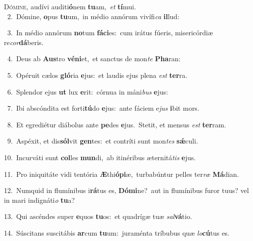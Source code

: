 \lettrine{\initial\textcolor{\initialcolor}{D}}{ómine,} audívi auditi\-\textbf{ó}\-nem \textbf{tu}\-am,~\star \textit{et} \textbf{tí}\-mui.\\
{\numbfont\textcolor{\numbcolor}{~2.}}~Dómine, \textbf{o}\-pus \textbf{tu}\-um,~\star in médio annórum vivífi\textit{ca} \textbf{il}\-lud:\par
{\numbfont\textcolor{\numbcolor}{~3.}}~In médio annórum \textbf{no}\-tum \textbf{fá}\-\textbf{ci}es:~\star cum irátus fúeris, misericórdiæ re\-\textit{cor}\-\textbf{dá}beris.\par
{\numbfont\textcolor{\numbcolor}{~4.}}~Deus ab \textbf{Aus}\-tro \textbf{vé}\-\textbf{ni}et,~\star et sanctus de mon\textit{te} \textbf{Pha}\-ran:\par
{\numbfont\textcolor{\numbcolor}{~5.}}~Opéruit cælos \textbf{gló}\-ria \textbf{e}\-jus:~\star et laudis ejus plena \textit{est} \textbf{ter}\-ra.\par
{\numbfont\textcolor{\numbcolor}{~6.}}~Splendor ejus \textbf{ut} lux \textbf{e}\-rit:~\star córnua in máni\textit{bus} \textbf{e}\-jus:\par
{\numbfont\textcolor{\numbcolor}{~7.}}~Ibi abscóndita est forti\-\textbf{tú}\-do \textbf{e}\-jus:~\star ante fáciem e\textit{jus} \textbf{i}\-bit mors.\par
{\numbfont\textcolor{\numbcolor}{~8.}}~Et egrediétur diábolus ante \textbf{pe}\-des \textbf{e}\-jus.~\star Stetit, et mensus \textit{est} \textbf{ter}\-ram.\par
{\numbfont\textcolor{\numbcolor}{~9.}}~Aspéxit, et dis\-\textbf{sól}\-vit \textbf{gen}\-tes:~\star et contríti sunt mon\textit{tes} \textbf{sǽ}\-culi.\par
{\numbfont\textcolor{\numbcolor}{10.}}~Incurváti sunt \textbf{col}\-les \textbf{mun}\-di,~\star ab itinéribus æternitá\textit{tis} \textbf{e}\-jus.\par
{\numbfont\textcolor{\numbcolor}{11.}}~Pro iniquitáte vidi tentória \textbf{Æ}\-thi\-\textbf{ó}\-\textbf{pi}æ,~\star turbabúntur pelles ter\textit{ræ} \textbf{Má}\-dian.\par
{\numbfont\textcolor{\numbcolor}{12.}}~Numquid in flumínibus i\-\textbf{rá}\-tus es, \textbf{Dó}\-\textbf{mi}ne?~\star aut in flumínibus furor tuus? vel in mari indignáti\textit{o} \textbf{tu}\-a?\par
{\numbfont\textcolor{\numbcolor}{13.}}~Qui ascéndes super \textbf{e}\-quos \textbf{tu}\-os:~\star et quadrígæ tuæ \textit{sal}\-\textbf{vá}tio.\par
{\numbfont\textcolor{\numbcolor}{14.}}~Súscitans suscitábis \textbf{ar}\-cum \textbf{tu}\-um:~\star juraménta tríbubus quæ \textit{lo}\-\textbf{cú}tus es.\par
